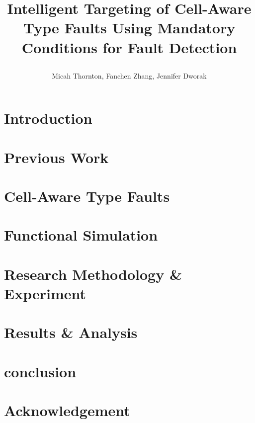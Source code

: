 \documentclass[conference]{IEEEtran}
\title{\author{Micah Thornton, Fanchen Zhang, Jennifer Dworak} Intelligent Targeting of Cell-Aware Type 
Faults Using Mandatory Conditions for Fault Detection}
\begin{document}
\maketitle{}
\begin{abstract}
    
\end{abstract}
\section{Introduction}
    \label{sec:intr}
    
\section{Previous Work}
    \label{sec:pw}
    
\section{Cell-Aware Type Faults}
    \label{sec:caf}
    
\section{Functional Simulation}
    \label{sec:fs}
    
\section{Research Methodology \& Experiment}
    \label{sec:meth}
    
\section{Results \& Analysis}
    \label{sec:res}
    
\section{conclusion}
    \label{sec:conc}
    
\section{Acknowledgement}
    \label{sec:ack}
    


\end{document}

